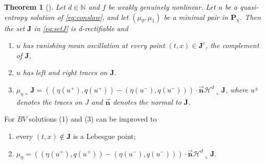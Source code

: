\documentclass[11pt, twoside, reqno]{amsart}
\newtheorem{thm}{Theorem}[section]
\theoremstyle{definition}
\theoremstyle{remark}
\numberwithin{equation}{section}
\newcommand{\bs}[1]{\boldsymbol{#1}}
\begin{document}
\begin{thm}[\cite{DOW03}]\label{thm:dimdthm}
   Let $d \in \mathbb N$ and $f$ be weakly genuinely nonlinear. Let $u$ be a quasi-entropy solution of \eqref{eq:conslaw}, and let $(\mu_0, \mu_1)$ be a minimal pair in $\mathbf P_{\chi}$. Then the set $\mathbf J$ in \eqref{eq:setJ}  is d-rectifiable and 
    \begin{enumerate}
        \item  $u$ has vanishing mean oscillation at every point $(t,x) \in \mathbf J^c$, the complement of $\mathbf J$,
        \item $u$ has left and right traces on $\mathbf J$.
   \item $\mu_\eta\llcorner \mathbf J= ((\eta(u^+),q(u^+)) - (\eta(u^-),q(u^-)))\cdot \vec{\bs n} \mathscr H^d\llcorner \mathbf J$, where $u^\pm$ denotes the traces on $J$ and $\vec{\bs n}$ denotes the normal to $\mathbf J$.
    \end{enumerate}
\end{thm}

For $BV$ solutions (1) and (3) can be improved to
\begin{enumerate}
\item[(1')] every $(t,x)\notin \mathbf J$ is a Lebesgue point;
\item[(3')] $\mu_\eta= ((\eta(u^+),q(u^+)) - (\eta(u^-),q(u^-)))\cdot \vec{\bs n}\mathscr H^d \llcorner \mathbf J$.
\end{enumerate}
\end{document}
